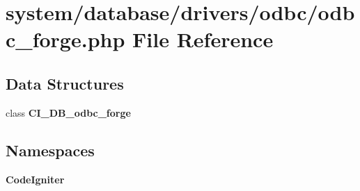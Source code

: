 \section{system/database/drivers/odbc/odbc\-\_\-forge.php File Reference}
\label{odbc__forge_8php}
\subsection*{Data Structures}
\begin{DoxyCompactItemize}
\item 
class {\bf C\-I\-\_\-\-D\-B\-\_\-odbc\-\_\-forge}
\end{DoxyCompactItemize}
\subsection*{Namespaces}
\begin{DoxyCompactItemize}
\item 
{\bf Code\-Igniter}
\end{DoxyCompactItemize}
